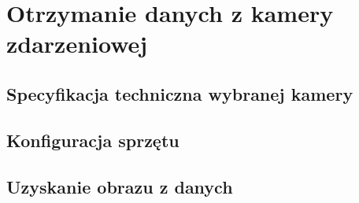 \chapter{Otrzymanie danych z kamery zdarzeniowej}
\label{cha:kamera}

\section{Specyfikacja techniczna wybranej kamery}
\label{sec:tech}

\section{Konfiguracja sprzętu}
\label{sec:konfiguracja}

\section{Uzyskanie obrazu z danych}
\label{sec:obraz}
